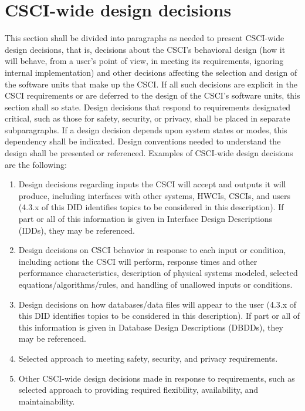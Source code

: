 \section{CSCI-wide design decisions}

This section shall be divided into paragraphs as needed to present
CSCI-wide design decisions, that is, decisions about the CSCI's
behavioral design (how it will behave, from a user's point of view, in
meeting its requirements, ignoring internal implementation) and other
decisions affecting the selection and design of the software units that
make up the CSCI. If all such decisions are explicit in the CSCI
requirements or are deferred to the design of the CSCI's software units,
this section shall so state. Design decisions that respond to
requirements designated critical, such as those for safety, security, or
privacy, shall be placed in separate subparagraphs. If a design decision
depends upon system states or modes, this dependency shall be indicated.
Design conventions needed to understand the design shall be presented or
referenced. Examples of CSCI-wide design decisions are the following:

\begin{enumerate}
\itemsep1pt\parskip0pt
\item
  Design decisions regarding inputs the CSCI will accept and outputs it
  will produce, including interfaces with other systems, HWCIs, CSCIs,
  and users (4.3.x of this DID identifies topics to be considered in
  this description). If part or all of this information is given in
  Interface Design Descriptions (IDDs), they may be referenced.
\item
  Design decisions on CSCI behavior in response to each input or
  condition, including actions the CSCI will perform, response times and
  other performance characteristics, description of physical systems
  modeled, selected equations/algorithms/rules, and handling of
  unallowed inputs or conditions.
\item
  Design decisions on how databases/data files will appear to the user
  (4.3.x of this DID identifies topics to be considered in this
  description). If part or all of this information is given in Database
  Design Descriptions (DBDDs), they may be referenced.
\item
  Selected approach to meeting safety, security, and privacy
  requirements.
\item
  Other CSCI-wide design decisions made in response to requirements,
  such as selected approach to providing required flexibility,
  availability, and maintainability.
\end{enumerate}

